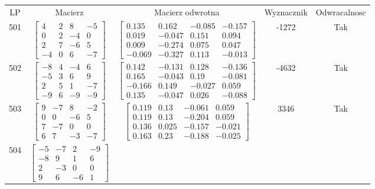 \documentclass[a4paper,12pt]{article}
\begin{document}
\bgroup {} \vspace{0.2in} \begin{tabular}{c c c c c}
LP & Macierz & Macierz odwrotna & Wyznacznik & Odwracalnosc\\
501
&
$\begin{bmatrix} 4 & 2 & 8 & -5 \\ 0 & 2 & -4 & 0 \\ 2 & 7 & -6 & 5 \\ -4 & 0 & 6 & -7 \end{bmatrix}$
&
$\begin{bmatrix} 0.135 & 0.162 & -0.085 & -0.157 \\ 0.019 & -0.047 & 0.151 & 0.094 \\ 0.009 & -0.274 & 0.075 & 0.047 \\ -0.069 & -0.327 & 0.113 & -0.013 \end{bmatrix}$
&
-1272
&
Tak
\\
502
&
$\begin{bmatrix} -8 & 4 & -4 & 6 \\ -5 & 3 & 6 & 9 \\ 2 & 5 & 1 & -7 \\ -9 & 6 & -9 & -9 \end{bmatrix}$
&
$\begin{bmatrix} 0.142 & -0.131 & 0.128 & -0.136 \\ 0.165 & -0.043 & 0.19 & -0.081 \\ -0.166 & 0.149 & -0.027 & 0.059 \\ 0.135 & -0.047 & 0.026 & -0.088 \end{bmatrix}$
&
-4632
&
Tak
\\
503
&
$\begin{bmatrix} 9 & -7 & 8 & -2 \\ 0 & 0 & -6 & 5 \\ 7 & -7 & 0 & 0 \\ 6 & 7 & -3 & -7 \end{bmatrix}$
&
$\begin{bmatrix} 0.119 & 0.13 & -0.061 & 0.059 \\ 0.119 & 0.13 & -0.204 & 0.059 \\ 0.136 & 0.025 & -0.157 & -0.021 \\ 0.163 & 0.23 & -0.188 & -0.025 \end{bmatrix}$
&
3346
&
Tak
\\
504
&
$\begin{bmatrix} -5 & -7 & 2 & -9 \\ -8 & 9 & 1 & 6 \\ 2 & -3 & 0 & 0 \\ 9 & 6 & -6 & 1 \end{bmatrix}$

\end{tabular}
\end{document}

